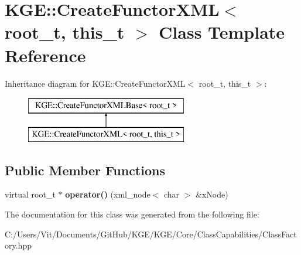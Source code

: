 \hypertarget{class_k_g_e_1_1_create_functor_x_m_l}{\section{K\-G\-E\-:\-:Create\-Functor\-X\-M\-L$<$ root\-\_\-t, this\-\_\-t $>$ Class Template Reference}
\label{class_k_g_e_1_1_create_functor_x_m_l}
}
Inheritance diagram for K\-G\-E\-:\-:Create\-Functor\-X\-M\-L$<$ root\-\_\-t, this\-\_\-t $>$\-:\begin{figure}[H]
\begin{center}
\leavevmode
\includegraphics[height=2.000000cm]{class_k_g_e_1_1_create_functor_x_m_l}
\end{center}
\end{figure}
\subsection*{Public Member Functions}
\begin{DoxyCompactItemize}
\item 
\hypertarget{class_k_g_e_1_1_create_functor_x_m_l_a46d109e27e5a68099766f7e231498b94}{virtual root\-\_\-t $\ast$ {\bfseries operator()} (xml\-\_\-node$<$ char $>$ \&x\-Node)}\label{class_k_g_e_1_1_create_functor_x_m_l_a46d109e27e5a68099766f7e231498b94}

\end{DoxyCompactItemize}


The documentation for this class was generated from the following file\-:\begin{DoxyCompactItemize}
\item 
C\-:/\-Users/\-Vit/\-Documents/\-Git\-Hub/\-K\-G\-E/\-K\-G\-E/\-Core/\-Class\-Capabilities/Class\-Factory.\-hpp\end{DoxyCompactItemize}

